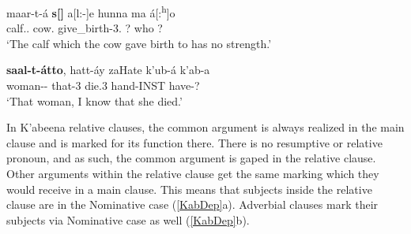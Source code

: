 \begin{exe}\ex\label{ArbDep}
\begin{xlist}
\ex\gll maar-t-\'a \textbf{s[\textglotstop{}]} a[l:-]e hunna ma \'a[:\textsuperscript{h}]o\\
calf.\fem{}.\nom{} cow.\nom{} give\_birth-3\sg{}.\pfv{} ? who ? \\
\glt`The calf which the cow gave birth to has no strength.'

\ex\gll \textbf{saal-t-\'atto}, hatt-\'ay zaHate k'ub-\'a k'ab-a\\
woman-\fem{}-\dist{} that-3\sg{} die.3\sg{} hand-INST have-? \\
\glt`That woman, I know that she died.' %
\end{xlist}
\end{exe}	

In K'abeena relative clauses, the common argument is always realized in the main clause and is marked for its function there.  
There is no resumptive or relative pronoun, and as such, the common argument is gaped in the  relative clause. 
Other arguments within the relative clause get the same marking which they would receive in a main clause.
This means that subjects inside the relative clause are in the Nominative  case (\ref{KabDep}a).
Adverbial clauses mark their subjects via Nominative  case as well (\ref{KabDep}b).
\enlargethispage{2\baselineskip}

